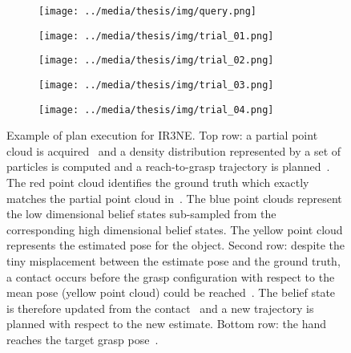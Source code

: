 \begin{figure}[!ht]
  \centering
  \begin{subfigure}[t]{0.4\textwidth}
       \texttt{[image: ../media/thesis/img/query.png]}
       \caption{}\label{fig:07:replan_1}
  \end{subfigure} 
  \quad
  \begin{subfigure}[t]{0.4\textwidth}
     \texttt{[image: ../media/thesis/img/trial\_01.png]}
     \caption{}\label{fig:07:replan_2}
  \end{subfigure}
 \quad
  \begin{subfigure}[t]{0.4\textwidth}
       \texttt{[image: ../media/thesis/img/trial\_02.png]}
       \caption{}\label{fig:07:replan_3}
  \end{subfigure} 
 \vspace{2mm}
  \begin{subfigure}[t]{0.4\textwidth}
     \texttt{[image: ../media/thesis/img/trial\_03.png]}
     \caption{}\label{fig:07:replan_4}
  \end{subfigure}
   \quad
  \begin{subfigure}[t]{0.4\textwidth}
       \texttt{[image: ../media/thesis/img/trial\_04.png]}
       \caption{}\label{fig:07:replan_5}
  \end{subfigure} 
\caption[SPAM-PLAN simulated results]{Example of plan execution for IR3NE. Top row: a partial point cloud is acquired~ and a density distribution represented by a set of particles is computed and a reach-to-grasp trajectory is planned~. The red point cloud identifies the ground truth which exactly matches the partial point cloud in~. The blue point clouds represent the low dimensional belief states sub-sampled from the corresponding high dimensional belief states. The yellow point cloud represents the estimated pose for the object. Second row: despite the tiny misplacement between the estimate pose and the ground truth, a contact occurs before the grasp configuration with respect to the mean pose (yellow point cloud) could be reached~. The belief state is therefore updated from the contact~ and a new trajectory is planned with respect to the new estimate. Bottom row: the hand reaches the target grasp pose~.}
\label{fig:07:spam.exec.example}
\end{figure}  

